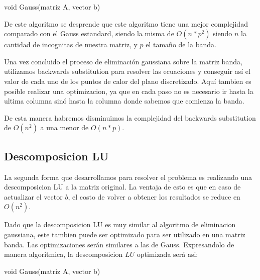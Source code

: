 \begin{algorithm}
\begin{algorithmic}[1]\parskip=1mm
\caption{void Gauss(matriz A, vector b)}
\end{algorithmic}
\end{algorithm}

De este algoritmo se desprende que este algoritmo tiene una mejor complejidad comparado con el Gauss estandard, siendo la misma de $O(n*p^2)$ siendo $n$ la cantidad de incognitas de nuestra matriz, y $p$ el tamaño de la banda.

Una vez concluido el proceso de eliminaci\'on gaussiana sobre la matriz banda, utilizamos backwards substitution para resolver las ecuaciones y conseguir as\'i el valor de cada uno de los puntos de calor del plano discretizado. Aqu\'i tambien es posible realizar una optimizacion, ya que en cada paso no es necesario ir hasta la ultima columna sin\'o hasta la columna donde sabemos que comienza la banda.

De esta manera habremos disminuimos la complejidad del backwards substitution de $O(n^2)$ a una menor de $O(n*p)$.

\subsection{Descomposicion LU}

La segunda forma que desarrollamos para resolver el problema es realizando una descomposicion LU a la matriz original. La ventaja de esto es que en caso de actualizar el vector $b$, el costo de volver a obtener los resultados se reduce en $O(n^2)$.

Dado que la descomposicion LU es muy similar al algoritmo de eliminacion gaussiana, este tambien puede ser optimizado para ser utilizado en una matriz banda. Las optimizaciones ser\'an similares a las de Gauss. Expresandolo de manera algoritmica, la descomposicion $LU$ optimizada ser\'a asi:

\begin{algorithm}
\begin{algorithmic}[1]\parskip=1mm
\caption{void Gauss(matriz A, vector b)}
\end{algorithmic}
\end{algorithm}


